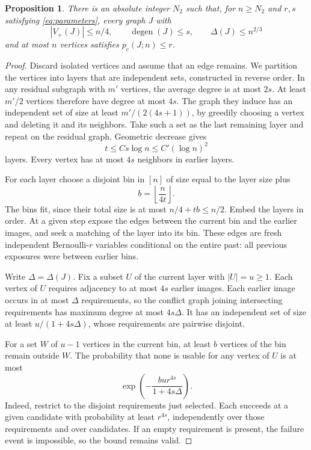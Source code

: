 \documentclass[11pt]{article}
\newtheorem{proposition}[theorem]{Proposition}
\theoremstyle{remark}
\numberwithin{equation}{section}
\DeclareMathOperator{\degen}{degen}
\begin{document}
\begin{proposition}\label{prop:degree-embedding}
There is an absolute integer $N_2$ such that, for $n\geq N_2$
and $r,s$ satisfying \eqref{eq:parameters}, every graph $J$
with
\[
 |V_+(J)|\leq n/4,\qquad \degen(J)\leq s,
 \qquad\Delta(J)\leq n^{2/3}
\]
and at most $n$ vertices satisfies $p_c(J;n)\leq r$.
\end{proposition}
\begin{proof}
Discard isolated vertices and assume that an edge remains.
We partition the vertices into layers that are independent sets, constructed
in reverse order. In any residual subgraph with $m'$ vertices,
the average degree is at most $2s$. At least $m'/2$ vertices
therefore have degree at most $4s$. The graph they induce has
an independent set of size at least $m'/(2(4s+1))$, by greedily
choosing a vertex and deleting it and its neighbors. Take such
a set as the last remaining layer and repeat on the residual
graph. Geometric decrease gives
\begin{equation}\label{eq:layers}
 t\leq C s\log n\leq C'(\log n)^2
\end{equation}
layers. Every vertex has at most $4s$ neighbors in earlier layers.

For each layer choose a disjoint bin in $[n]$ of size equal to
the layer size plus
\[
 b=\left\lfloor\frac{n}{4t}\right\rfloor.
\]
The bins fit, since their total size is at most $n/4+tb\leq n/2$.
Embed the layers in order. At a given step expose the edges
between the current bin and the earlier images, and seek a
matching of the layer into its bin. These edges are fresh
independent Bernoulli-$r$ variables conditional on the entire
past: all previous exposures were between earlier bins.

Write $\Delta=\Delta(J)$. Fix a subset $U$ of the current
layer with $|U|=u\geq1$. Each vertex of $U$ requires adjacency
to at most $4s$ earlier images. Each earlier image occurs in at
most $\Delta$ requirements, so the conflict graph joining
intersecting requirements has maximum degree at most $4s\Delta$.
It has an independent set of size at least
$u/(1+4s\Delta)$, whose requirements are pairwise disjoint.

For a set $W$ of $u-1$ vertices in the current bin, at least $b$
vertices of the bin remain outside $W$. The probability that
none is usable for any vertex of $U$ is at most
\begin{equation}\label{eq:hall-failure}
 \exp\!\left(-\frac{bu r^{4s}}{1+4s\Delta}\right).
\end{equation}
Indeed, restrict to the disjoint requirements just selected.
Each succeeds at a given candidate with probability at least
$r^{4s}$, independently over those requirements and over
candidates. If an empty requirement is present, the failure
event is impossible, so the bound remains valid.


\end{proof}
\end{document}
